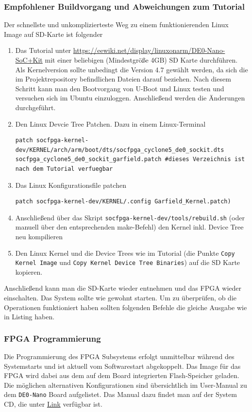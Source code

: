 \subsubsection{Empfohlener Buildvorgang und Abweichungen zum Tutorial}
Der schnellste und unkomplizierteste Weg zu einem funktionierenden Linux Image auf SD-Karte ist folgender
\begin{enumerate}
	\item Das Tutorial unter \href{https://eewiki.net/display/linuxonarm/DE0-Nano-SoC+Kit}{https://eewiki.net/display/linuxonarm/DE0-Nano-SoC+Kit} mit einer beliebigen (Mindestgröße 4GB) SD Karte durchführen. Als Kernelversion sollte unbedingt die Version 4.7 gewählt werden, da sich die im Projektrepository befindlichen Dateien darauf beziehen. Nach diesem Schritt kann man den Bootvorgang von U-Boot und Linux testen und versuchen sich im Ubuntu einzuloggen. Anschließend werden die Änderungen durchgeführt.
	\item Den Linux Devcie Tree Patchen. Dazu in einem Linux-Terminal
\lstset{language=bash}
	\begin{lstlisting}[breaklines=true]
patch socfpga-kernel-dev/KERNEL/arch/arm/boot/dts/socfpga_cyclone5_de0_sockit.dts socfpga_cyclone5_de0_sockit_garfield.patch #dieses Verzeichnis ist nach dem Tutorial verfuegbar
	\end{lstlisting}
	\item Das Linux Konfigurationsfile patchen
	\begin{lstlisting}[breaklines=true]
patch socfpga-kernel-dev/KERNEL/.config Garfield_Kernel.patch)
	\end{lstlisting}
	\item Anschließend über das Skript \texttt{socfpga-kernel-dev/tools/rebuild.sh} (oder manuell über den entsprechenden make-Befehl) den Kernel inkl. Device Tree neu kompilieren
	\item Den Linux Kernel und die Device Trees wie im Tutorial (die Punkte \texttt{Copy Kernel Image} und \texttt{Copy Kernel Device Tree Binaries}) auf die SD Karte kopieren.
\end{enumerate}

Anschließend kann man die SD-Karte wieder entnehmen und das \ac{FPGA} wieder einschalten. Das System sollte wie gewohnt starten. Um zu überprüfen, ob die Operationen funktioniert haben sollten folgenden Befehle die gleiche Ausgabe wie in Listing  haben. 

\subsubsection{\ac{FPGA} Programmierung}
Die Programmierung des \ac{FPGA} Subsystems erfolgt unmittelbar während des Systemstarts und ist aktuell vom Softwarestart abgekoppelt. Das Image für das \ac{FPGA} wird dabei aus dem auf dem Board integrierten Flash-Speicher geladen. Die möglichen alternativen Konfigurationen sind übersichtlich im User-Manual zu dem \texttt{DE0-Nano} Board aufgelistet. Das Manual dazu findet man auf der System CD, die unter \href{http://www.terasic.com/downloads/cd-rom/de0-nano-soc/}{Link} verfügbar ist.\\

